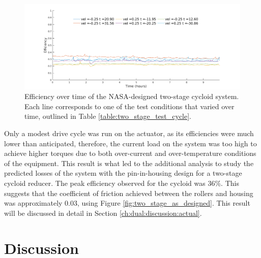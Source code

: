 \begin{figure}[!t]
	\centering
	\hspace*{-2cm}\includegraphics[width=1.2\columnwidth]{fig/two_stage_eff}
   \caption{Efficiency over time of the NASA-designed two-stage cycloid system. Each line corresponds to one of the test conditions that varied over time, outlined in Table \ref{table:two_stage_test_cycle}.}
   \label{fig:two_stage_eff}
\end{figure}

Only a modest drive cycle was run on the actuator, as its efficiencies were much lower than anticipated, therefore, the current load on the system was too high to achieve higher torques due to both over-current and over-temperature conditions of the equipment. This result is what led to the additional analysis to study the predicted losses of the system with the pin-in-housing design for a two-stage cycloid reducer. The peak efficiency observed for the cycloid was 36\%. This suggests that the coefficient of friction achieved between the rollers and housing was approximately 0.03, using Figure \ref{fig:two_stage_as_designed}. This result will be discussed in detail in Section \ref{ch:dual:discussion:actual}.


\section{Discussion} \label{ch:dual:discussion}

